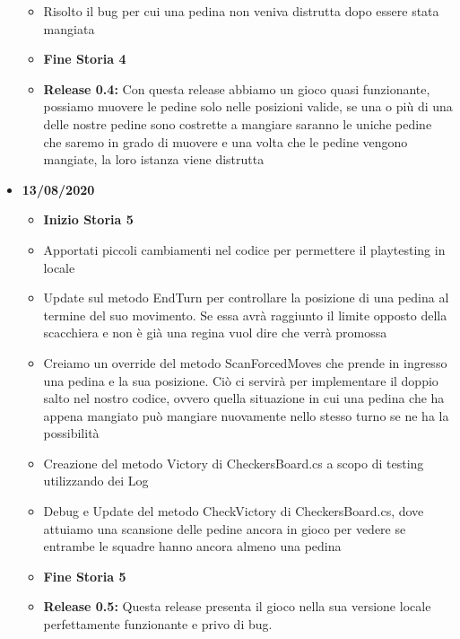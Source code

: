 \documentclass[12pt]{article}
\begin{document}
\begin{itemize}
\begin{itemize}
	\item Risolto il bug per cui una pedina non veniva distrutta dopo essere stata mangiata
	\item \textbf{Fine Storia 4}
	\item \textbf{Release 0.4:} Con questa release abbiamo un gioco quasi funzionante, possiamo muovere le pedine solo nelle posizioni valide, se una o più di una delle nostre pedine sono costrette a mangiare saranno le uniche pedine che saremo in grado di muovere e una volta che le pedine vengono mangiate, la loro istanza viene distrutta
	\end{itemize}
\item \textbf{13/08/2020}
	\begin{itemize}
	\item \textbf{Inizio Storia 5}
	\item Apportati piccoli cambiamenti nel codice per permettere il playtesting in locale
	\item Update sul metodo EndTurn per controllare la posizione di una pedina al termine del suo movimento. Se essa avrà raggiunto il limite opposto della scacchiera e non è già una regina vuol dire che verrà promossa
	\item Creiamo un override del metodo ScanForcedMoves che prende in ingresso una pedina e la sua posizione. Ciò ci servirà per implementare il doppio salto nel nostro codice, ovvero quella situazione in cui una pedina che ha appena mangiato può mangiare nuovamente nello stesso turno se ne ha la possibilità
	\item Creazione del metodo Victory di CheckersBoard.cs a scopo di testing utilizzando dei Log
	\item Debug e Update del metodo CheckVictory di CheckersBoard.cs, dove attuiamo una scansione delle pedine ancora in gioco per vedere se entrambe le squadre hanno ancora almeno una pedina
	\item \textbf{Fine Storia 5}
	\item \textbf{Release 0.5: } Questa release presenta il gioco nella sua versione locale perfettamente funzionante e privo di bug.
	\end{itemize}
\end{itemize}
\end{document}
